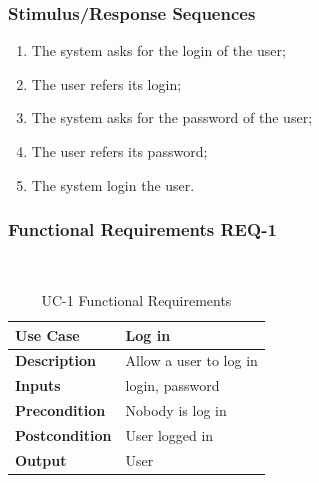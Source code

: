 \documentclass{report}
\begin{document}

\subsubsection*{Stimulus/Response Sequences}
\begin{enumerate}
	\item The system asks for the login of the user;
	\item The user refers its login;
	\item The system asks for the password of the user;
	\item The user refers its password;
	\item The system login the user.
\end{enumerate}


\subsubsection*{Functional Requirements REQ-1} ~~~
\begin{table}[H]
	\begin{center}
		\begin{tabular}{|m{4cm}|m{10cm}|}
		\hline
		\textbf{Use Case} & Log in \\
		\hline
		\textbf{Description} & Allow a user to log in  \\
		\hline
		\textbf{Inputs} & login, password \\
		\hline
		\textbf{Precondition} & Nobody is log in  \\
		\hline
		\textbf{Postcondition} & User logged in \\
		\hline
		\textbf{Output} & User \\
		\hline
		\end{tabular}
	\end{center}
	\caption{UC-1 Functional Requirements}
	\label{table:REQ-1}
\end{table}

\end{document}
